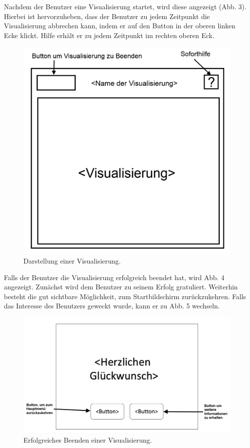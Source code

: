 \documentclass{article}
\begin{document}
Nachdem der Benutzer eine Visualisierung startet, wird diese angezeigt (Abb. 3). Hierbei ist hervorzuheben, dass der Benutzer zu jedem Zeitpunkt die Visualisierung abbrechen kann, indem er auf den Button in der oberen linken Ecke klickt. Hilfe erhält er zu jedem Zeitpunkt im rechten oberen Eck.

\begin{figure}[H]
  \centering
    \includegraphics[width=\textwidth]{resources/ui_walkthrough_visualisation-draft}
  \caption{Darstellung einer Visualisierung.}
\end{figure}

Falls der Benutzer die Visualisierung erfolgreich beendet hat, wird Abb. 4 angezeigt. Zunächst wird dem Benutzer zu seinem Erfolg gratuliert. Weiterhin besteht die gut sichtbare Möglichkeit, zum Startbildschirm zurückzukehren. Falls das Interesse des Benutzers geweckt wurde, kann er zu Abb. 5 wechseln.

\begin{figure}[H]
  \centering
    \includegraphics[width=\textwidth]{resources/ui_walkthrough_end-draft}
  \caption{Erfolgreiches Beenden einer Visualisierung.}
\end{figure}
\end{document}

